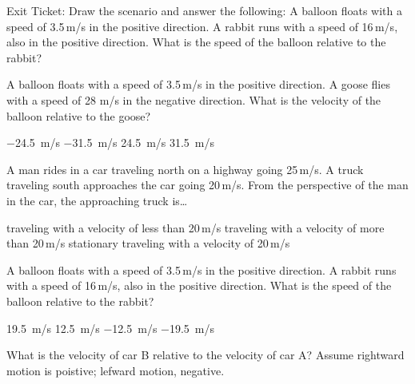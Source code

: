 \documentclass[]{exam}
\begin{document}
\begin{questions}
\question
Exit Ticket:  Draw the scenario and answer the following: A balloon floats with a speed of 3.5\,m/s in the positive direction.  A rabbit runs with a speed of 16\,m/s, also in the positive direction.  What is the speed of the balloon relative to the rabbit?


\question
A balloon floats with a speed of 3.5\,m/s in the positive direction.  A goose flies with a speed of 28 m/s in the negative direction. What is the velocity of the balloon relative to the goose?

\begin{randomizechoices}
    \choice \SI{-24.5}{m/s}
    \choice \SI{-31.5}{m/s}
    \choice \SI{24.5}{m/s}
    \correctchoice \SI{31.5}{m/s}
\end{randomizechoices}

\question
A man rides in a car traveling north on a highway going 25\,m/s. A truck traveling south approaches the car going 20\,m/s. From the perspective of the man in the car, the approaching truck is\dots

\begin{randomizechoices}
    \choice traveling with a velocity of less than 20\,m/s
    \choice traveling with a velocity of more than 20\,m/s
    \choice stationary
    \choice traveling with a velocity of 20\,m/s
\end{randomizechoices}

\question
A balloon floats with a speed of 3.5\,m/s in the positive direction. A rabbit runs with a speed of 16\,m/s, also in the positive direction. What is the speed of the balloon relative to the rabbit?

\begin{randomizechoices}
    \choice \SI{19.5}{m/s}
    \choice \SI{12.5}{m/s}
    \correctchoice \SI{-12.5}{m/s}
    \choice \SI{-19.5}{m/s}
\end{randomizechoices}

\question
What is the velocity of car B relative to the velocity of car A? Assume rightward motion is poistive; lefward motion, negative.

\begin{center}
\end{center}


\end{questions}
\end{document}
